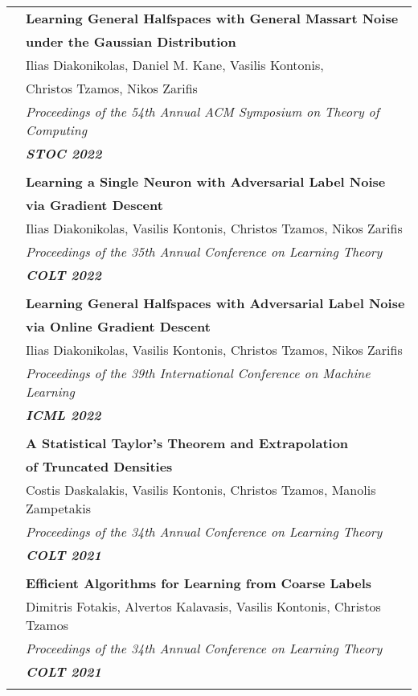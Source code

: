 \documentclass[letterpaper,11pt,oneside]{article}
\begin{document}
\begin{longtable}{@{} l l}
 &\textbf{Learning General Halfspaces with General Massart Noise}\\
 & \textbf{under the Gaussian Distribution}\\
 & Ilias Diakonikolas, Daniel M. Kane, Vasilis Kontonis,\\
 & Christos Tzamos, Nikos Zarifis \\
 & \emph{Proceedings of the 54th Annual ACM Symposium on Theory of Computing}\\
 & \emph{\textbf{STOC 2022}} \\
 & \\


 &\textbf{Learning a Single Neuron with Adversarial Label Noise}\\
 & \textbf{via Gradient Descent}\\
 & Ilias Diakonikolas, Vasilis Kontonis, Christos Tzamos, Nikos Zarifis \\
 & \emph{Proceedings of the 35th Annual Conference on Learning Theory}\\
 & \emph{\textbf{COLT 2022}} \\
 & \\


 &\textbf{Learning General Halfspaces with Adversarial Label Noise}\\
 & \textbf{via Online Gradient Descent}\\
 & Ilias Diakonikolas, Vasilis Kontonis, Christos Tzamos, Nikos Zarifis \\
 & \emph{Proceedings of the 39th International Conference on Machine Learning} \\
 & \emph{\textbf{ICML 2022}} \\
 & \\


 &\textbf{A Statistical Taylor's Theorem and Extrapolation}\\
 & \textbf{of Truncated Densities}\\
 & Costis Daskalakis, Vasilis Kontonis, Christos Tzamos, Manolis Zampetakis \\
 & \emph{Proceedings of the 34th Annual Conference on Learning Theory} \\
 & \emph{\textbf{COLT 2021}} \\
 & \\

 &\textbf{Efficient Algorithms for Learning from Coarse Labels}\\
 &  Dimitris Fotakis, Alvertos Kalavasis, Vasilis Kontonis, Christos Tzamos \\
 & \emph{Proceedings of the 34th Annual Conference on Learning Theory} \\
 & \emph{\textbf{COLT 2021}} \\
 & \\


\end{longtable}
\end{document}
